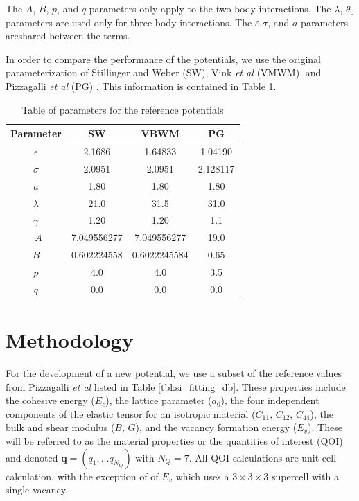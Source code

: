The $A$, $B$, $p$, and $q$ parameters only apply to the two-body interactions.
The $\lambda$, $\theta_0$ parameters are used only for three-body interactions.
The $\varepsilon$,$\sigma$, and $a$ parameters areshared between the terms.

In order to compare the performance of the potentials, we use the original parameterization of Stillinger and Weber (SW)\cite{stillinger1985_sw}, Vink \emph{et al} (VMWM)\cite{vink2001_sw_Si}, and Pizzagalli \emph{et al} (PG) \cite{pizzagalli2013_sw_Si}.  This information is contained in Table \ref{tbl:sw_parameters_ref}.

\begin{table}[ht]
	\centering
	\caption{Table of parameters for the reference potentials}
	\label{tbl:sw_parameters_ref}
	\begin{tabular}{c c c c}
		\hline
		Parameter & SW & VBWM & PG \\
		\hline
		$\epsilon$ & 2.1686 & 1.64833 & 1.04190 \\
		$\sigma$ &   2.0951 & 2.0951 & 2.128117 \\
		$a$ &       1.80 & 1.80 & 1.80 \\
		$\lambda$ & 21.0 & 31.5 & 31.0 \\
		$\gamma$ & 1.20 & 1.20 & 1.1 \\\
		$A$ & 7.049556277 & 7.049556277 & 19.0 \\
		$B$ & 0.602224558 & 0.6022245584 & 0.65 \\
		$p$ & 4.0 & 4.0 & 3.5 \\
		$q$ & 0.0 & 0.0 & 0.0 \\
		\hline
	\end{tabular}
\end{table}

\section{Methodology}

For the development of a new potential, we use a subset of the reference values from Pizzagalli \emph{et al} \cite{pizzagalli2013_sw_Si} listed in Table \ref{tbl:si_fitting_db}.  These properties include the cohesive energy ($E_c$), the lattice parameter ($a_0$), the four independent components of the elastic tensor for an isotropic material ($C_{11}$, $C_{12}$, $C_{44}$), the bulk and shear modulus ($B$, $G$), and the vacancy formation energy ($E_v$).
These will be referred to as the material properties or the quantities of interest (QOI) and denoted $\bm{q}=(q_1,...q_{N_Q})$ with $N_Q = 7$.
All QOI calculations are unit cell calculation, with the exception of of $E_v$ which uses a $3 \times 3 \times 3$ supercell with a single vacancy.

